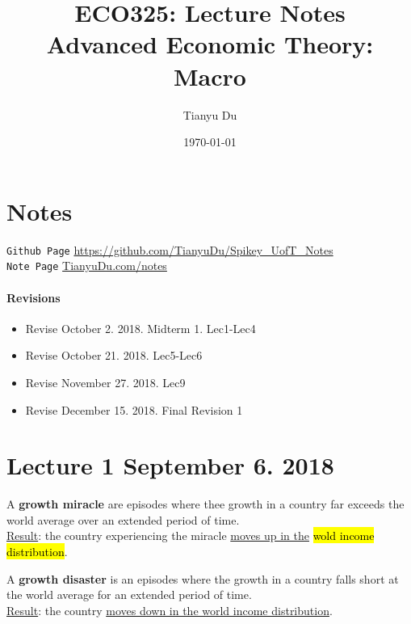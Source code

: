 \documentclass[11pt]{article}
\title{ECO325: Lecture Notes \\ \small Advanced Economic Theory: Macro}
\author{Tianyu Du}
\date{\today}
\begin{document}
    \maketitle
    \doclicenseThis
    \section*{Notes}
    	\texttt{Github Page} \url{https://github.com/TianyuDu/Spikey_UofT_Notes}\\
    	\texttt{Note Page} \url{TianyuDu.com/notes}
    \paragraph{Revisions}
    \begin{itemize}
    	\item Revise October 2. 2018. Midterm 1. Lec1-Lec4
    	\item Revise October 21. 2018. Lec5-Lec6
    	\item Revise November 27. 2018. Lec9
    	\item Revise December 15. 2018. Final Revision 1
    \end{itemize}
    \tableofcontents
    \newpage
    
    \section{Lecture 1 September 6. 2018}
        \begin{definition}
            A \textbf{growth miracle} are episodes where thee growth in a country far exceeds the world average over an extended period of time. \\
            \ul{Result}: the country experiencing the miracle \ul{moves up in the} \hl{wold income distribution}.
        \end{definition}
        
        \begin{definition}
            A \textbf{growth disaster} is an episodes where the growth in a country falls short at the world average for an extended period of time. \\
            \ul{Result}: the country \ul{moves down in the world income distribution}.
        \end{definition}
    
\end{document}
